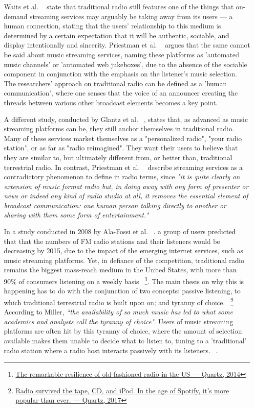 Waits et al. ~\cite{Waits2007} state that traditional radio still features one of the things that on-demand streaming services may arguably be taking away from its users — a human connection, stating that the users' relationship to this medium is determined by a certain expectation that it will be authentic, sociable, and display intentionally and sincerity. Priestman et al. ~\cite{Priestman2005} argues that the same cannot be said about music streaming services, naming these platforms as 'automated music channels' or 'automated web jukeboxes', due to the absence of the sociable component in conjunction with the emphasis on the listener's music selection. The researchers' approach on traditional radio can be defined as a 'human communication', where one senses that the voice of an announcer creating the threads between various other broadcast elements becomes a key point. 

A different study, conducted by Glantz et al. ~\cite{Glantz2016}, states that, as advanced as music streaming platforms can be, they still anchor themselves in traditional radio. Many of these services market themselves as a "personalized radio", "your radio station", or as far as "radio reimagined". They want their users to believe that they are similar to, but ultimately different from, or better than, traditional terrestrial radio. In contrast, Priestman et al. ~\cite{Priestman2005} describe streaming services as a contradictory phenomenon to define in radio terms, since \textit{"it is quite clearly an extension of music format radio but, in doing away with any form of presenter or news or indeed any kind of radio studio at all, it removes the essential element of broadcast communication: one human person talking directly to another or sharing with them some form of entertainment."}

In a study conducted in 2008 by Ala-Fossi et al. ~\cite{Ala-Fossi2008}. a group of users predicted that that the numbers of FM radio stations and their listeners would be decreasing by 2015, due to the impact of the emerging internet services, such as music streaming platforms. Yet, in defiance of the competition, traditional radio remains the biggest mass-reach medium in the United States, with more than 90\% of consumers listening on a weekly basis ~\footnote{\href{https://qz.com/195349/the-remarkable-resilience-of-old-fashioned-radio-in-the-us/}{The remarkable resilience of old-fashioned radio in the US — Quartz, 2014}}. The main thesis on why this is happening has to do with the conjunction of two concepts: passive listening, to which traditional terrestrial radio is built upon on; and tyranny of choice. ~\footnote{\href{https://qz.com/1094963/radio-survived-the-tape-cd-and-ipod-in-the-age-of-spotify-its-more-popular-than-ever/}{Radio survived the tape, CD, and iPod. In the age of Spotify, it’s more popular than ever. — Quartz, 2017}} According to Miller, \textit{“the availability of so much music has led to what some academics and analysts call the tyranny of choice"}. Users of music streaming platforms are often hit by this tyranny of choice, where the amount of selection available makes them unable to decide what to listen to, tuning to a 'traditional' radio station where a radio host interacts passively with its listeners. ~\cite{Pedersen2014}.

